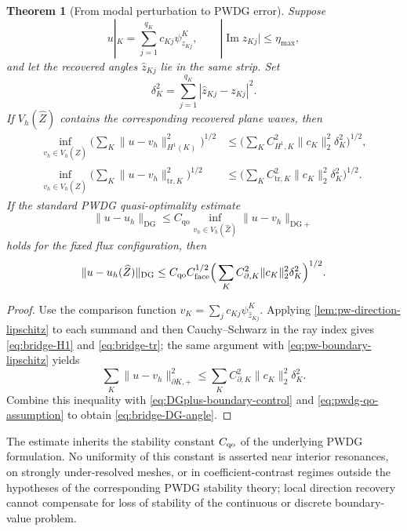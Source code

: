 \documentclass[11pt]{article}
\newtheorem{theorem}{Theorem}[section]
\renewcommand{\Im}{\operatorname{Im}}
\numberwithin{equation}{section}
\begin{document}
\begin{theorem}[From modal perturbation to PWDG error]\label{thm:esprit-pwdg-bridge}
Suppose
\begin{equation}\label{eq:local-finite-ray-bridge}
 u|_K=\sum_{j=1}^{q_K}c_{Kj}\psi_{z_{Kj}}^K,
 \qquad |\Im z_{Kj}|\le\eta_{\max},
\end{equation}
and let the recovered angles $\widehat z_{Kj}$ lie in the same strip.  Set
\[
 \delta_K^2=\sum_{j=1}^{q_K}|\widehat z_{Kj}-z_{Kj}|^2.
\]
If $V_h(\widehat Z)$ contains the corresponding recovered plane waves, then
\begin{align}
 \inf_{v_h\in V_h(\widehat Z)}
 \Big(\sum_K\|u-v_h\|_{H^1(K)}^2\Big)^{1/2}
 &\le\Big(\sum_K C_{H^1,K}^2\|c_K\|_2^2\delta_K^2\Big)^{1/2},\label{eq:bridge-H1}\\
 \inf_{v_h\in V_h(\widehat Z)}
 \Big(\sum_K\|u-v_h\|_{\mathrm{tr},K}^2\Big)^{1/2}
 &\le\Big(\sum_K C_{\mathrm{tr},K}^2\|c_K\|_2^2\delta_K^2\Big)^{1/2}.\label{eq:bridge-tr}
\end{align}
If the standard PWDG quasi-optimality estimate
\begin{equation}\label{eq:pwdg-qo-assumption}
 \|u-u_h\|_{\mathrm{DG}}
 \le C_{\mathrm{qo}}\inf_{v_h\in V_h(\widehat Z)}\|u-v_h\|_{\mathrm{DG}+}
\end{equation}
holds for the fixed flux configuration, then
\begin{equation}\label{eq:bridge-DG-angle}
 \|u-u_h(\widehat Z)\|_{\mathrm{DG}}
 \le C_{\mathrm{qo}}C_{\rm face}^{1/2}
 \Big(\sum_K C_{\partial,K}^2\|c_K\|_2^2\delta_K^2\Big)^{1/2}.
\end{equation}
\end{theorem}
\begin{proof}
Use the comparison function $v_K=\sum_jc_{Kj}\psi_{\widehat z_{Kj}}^K$.  Applying \cref{lem:pw-direction-lipschitz} to each summand and then Cauchy--Schwarz in the ray index gives \eqref{eq:bridge-H1} and \eqref{eq:bridge-tr}; the same argument with \eqref{eq:pw-boundary-lipschitz} yields
\[
 \sum_K\|u-v_h\|_{\partial K,+}^2
 \le \sum_K C_{\partial,K}^2\|c_K\|_2^2\delta_K^2.
\]
Combine this inequality with \eqref{eq:DGplus-boundary-control} and \eqref{eq:pwdg-qo-assumption} to obtain \eqref{eq:bridge-DG-angle}.
\end{proof}

The estimate inherits the stability constant $C_{\rm qo}$ of the underlying PWDG formulation.  No uniformity of this constant is asserted near interior resonances, on strongly under-resolved meshes, or in coefficient-contrast regimes outside the hypotheses of the corresponding PWDG stability theory; local direction recovery cannot compensate for loss of stability of the continuous or discrete boundary-value problem.
\end{document}
